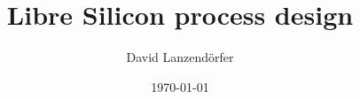 \documentclass[10pt,a4paper,oneside]{article}
\title{Libre Silicon process design}
\date{\today}
\author{David Lanzendörfer}
\newcounter{ct}
\begin{document}
\begin{abstract}
	
\end{abstract}
\newpage

\maketitle

\newpage




\newpage

\newpage

\newpage

\newpage

\newpage

\newpage

\end{document}
